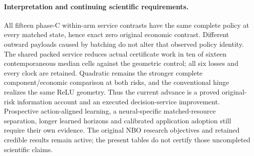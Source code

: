 \paragraph{Interpretation and continuing scientific requirements.}
All fifteen phase-C within-arm service contrasts have the same complete
policy at every matched state, hence exact zero original economic contrast.
Different outward payloads caused by batching do not alter that observed
policy identity. The shared packed service reduces actual certificate work
in ten of sixteen contemporaneous median cells against the geometric control;
all six losses and every clock are retained. Quadratic remains the stronger
complete component/economic comparison at both risks, and the conventional
hinge realizes the same ReLU geometry. Thus the current advance is a proved
original-risk information account and an executed decision-service improvement.
Prospective action-aligned learning, a neural-specific matched-resource
separation, longer learned horizons and calibrated application adoption still
require their own evidence. The original NBO research objectives and retained
credible results remain active; the present tables do not certify those
uncompleted scientific claims.
